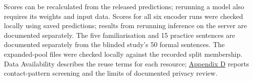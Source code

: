 \documentclass[fleqn,12pt]{wlpeerj}
\begin{document}
\begin{table}[!htbp]
Scores can be recalculated from the released predictions; rerunning a model also requires its weights and input data. Scores for all six encoder runs were checked locally using saved predictions; results from rerunning inference on the server are documented separately. The five familiarisation and 15 practice sentences are documented separately from the blinded study's 50 formal sentences. The expanded-pool files were checked locally against the recorded split membership. Data Availability describes the reuse terms for each resource; \hyperref[sec:resource-access]{Appendix D} reports contact-pattern screening and the limits of documented privacy review.
\end{table}

\end{document}
